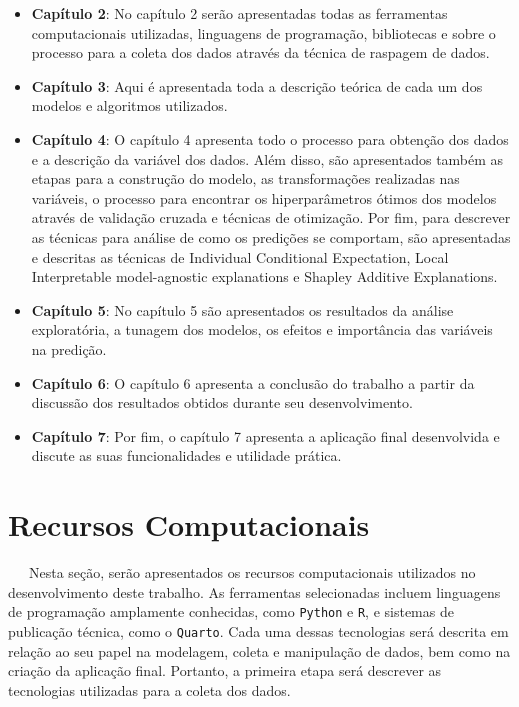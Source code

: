 \documentclass[
  12pt,
  a4paper,
]{scrreprt}
\begin{document}
\begin{itemize}
\item
  \textbf{Capítulo 2}: No capítulo 2 serão apresentadas todas as
  ferramentas computacionais utilizadas, linguagens de programação,
  bibliotecas e sobre o processo para a coleta dos dados através da
  técnica de raspagem de dados.
\item
  \textbf{Capítulo 3}: Aqui é apresentada toda a descrição teórica de
  cada um dos modelos e algoritmos utilizados.
\item
  \textbf{Capítulo 4}: O capítulo 4 apresenta todo o processo para
  obtenção dos dados e a descrição da variável dos dados. Além disso,
  são apresentados também as etapas para a construção do modelo, as
  transformações realizadas nas variáveis, o processo para encontrar os
  hiperparâmetros ótimos dos modelos através de validação cruzada e
  técnicas de otimização. Por fim, para descrever as técnicas para
  análise de como os predições se comportam, são apresentadas e
  descritas as técnicas de Individual Conditional Expectation, Local
  Interpretable model-agnostic explanations e Shapley Additive
  Explanations.
\item
  \textbf{Capítulo 5}: No capítulo 5 são apresentados os resultados da
  análise exploratória, a tunagem dos modelos, os efeitos e importância
  das variáveis na predição.
\item
  \textbf{Capítulo 6}: O capítulo 6 apresenta a conclusão do trabalho a
  partir da discussão dos resultados obtidos durante seu
  desenvolvimento.
\item
  \textbf{Capítulo 7}: Por fim, o capítulo 7 apresenta a aplicação final
  desenvolvida e discute as suas funcionalidades e utilidade prática.
\end{itemize}

\newpage

\chapter{Recursos Computacionais}\label{recursos-computacionais}

~~~Nesta seção, serão apresentados os recursos computacionais utilizados
no desenvolvimento deste trabalho. As ferramentas selecionadas incluem
linguagens de programação amplamente conhecidas, como \texttt{Python} e
\texttt{R}, e sistemas de publicação técnica, como o \texttt{Quarto}.
Cada uma dessas tecnologias será descrita em relação ao seu papel na
modelagem, coleta e manipulação de dados, bem como na criação da
aplicação final. Portanto, a primeira etapa será descrever as
tecnologias utilizadas para a coleta dos dados.
\end{document}
